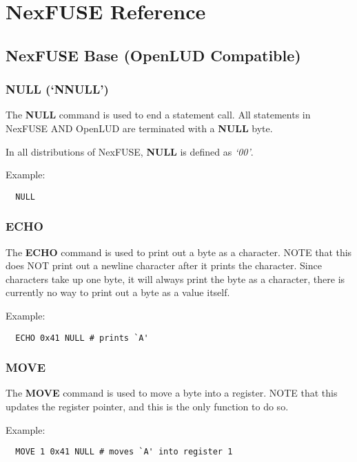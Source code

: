 \documentclass{article}
\begin{document}
\section{NexFUSE Reference}

\subsection{NexFUSE Base (OpenLUD Compatible)}

\subsubsection{\textbf{NULL (`NNULL')}}

The \textbf{NULL} command is used to end a statement call. All statements in
NexFUSE AND OpenLUD are terminated with a \textbf{NULL} byte.

In all distributions of NexFUSE, \textbf{NULL} is defined as \emph{`00'}.

Example:

\begin{verbatim}
  NULL
\end{verbatim}

\subsubsection{\textbf{ECHO}}

The \textbf{ECHO} command is used to print out a byte as a character. NOTE that
this does NOT print out a newline character after it prints the character. Since
characters take up one byte, it will always print the byte as a character, there
is currently no way to print out a byte as a value itself.

Example:
\begin{verbatim}
  ECHO 0x41 NULL # prints `A'
\end{verbatim}

\subsubsection{\textbf{MOVE}}

The \textbf{MOVE} command is used to move a byte into a register. NOTE that this
updates the register pointer, and this is the only function to do so.

Example:
\begin{verbatim}
  MOVE 1 0x41 NULL # moves `A' into register 1
\end{verbatim}
\end{document}
